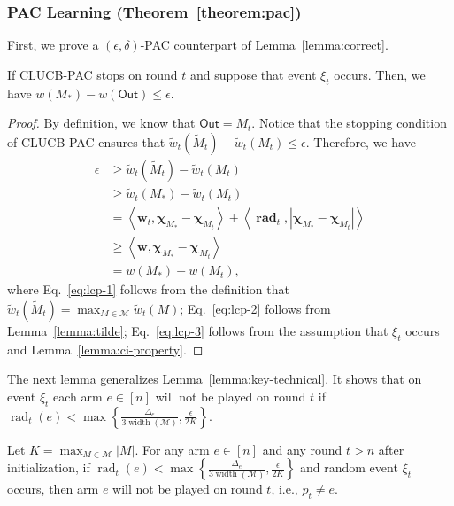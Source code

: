 \documentclass{article}
\newcommand{\AlgorithmPAC}{{\small \textsf{CLUCB-PAC}}\xspace}
\newcommand{\M}{\mathcal M}
\DeclareMathOperator{\rank}{width}
\DeclareMathOperator{\rad}{rad}
\newcommand{\out}{\mathsf{Out}}
\newcommand{\inn}[1]{\left\langle #1 \right\rangle}
\renewcommand{\vec}[1]{\boldsymbol{#1}}
\begin{document}
\subsubsection{PAC Learning (Theorem~\ref{theorem:pac})}
First, we prove a $(\epsilon,\delta)$-PAC counterpart of Lemma~\ref{lemma:correct}.
\begin{lemma}
\label{lemma:pac-correct}
If \AlgorithmPAC stops on round $t$ and suppose that event $\xi_t$ occurs. 
Then, we have $w(M_*)-w(\out) \le \epsilon$.
\end{lemma}

\begin{proof}
By definition, we know that $\out = M_t$.
Notice that the stopping condition of \AlgorithmPAC ensures that $\tilde w_t(\tilde M_t) - \tilde w_t(M_t) \le \epsilon$.
Therefore, we have
\begin{align}
	\epsilon &\ge \tilde w_t(\tilde M_t) - \tilde w_t(M_t) \nonumber \\
           &\ge \tilde w_t(M_*) - \tilde w_t(M_t) \label{eq:lcp-1} \\
           &= \inn{\vec {\bar w}_t, \vec \chi_{M_*}-\vec\chi_{M_t}}+\inn{\vec \rad_t, |\vec \chi_{M_*}-\vec\chi_{M_t}|} \label{eq:lcp-2}\\
           &\ge \inn{\vec w, \vec \chi_{M_*}-\vec\chi_{M_t}}  \label{eq:lcp-3} \\
           &= w(M_*)-w(M_t),\nonumber
\end{align}
where Eq.~\eqref{eq:lcp-1} follows from the definition that $\tilde w_t(\tilde M_t) = \max_{M\in \M}\tilde w_t(M)$;
Eq.~\eqref{eq:lcp-2} follows from Lemma~\ref{lemma:tilde};
Eq.~\eqref{eq:lcp-3} follows from the assumption that $\xi_t$ occurs and Lemma~\ref{lemma:ci-property}.
\end{proof}

The next lemma generalizes Lemma~\ref{lemma:key-technical}.  
It shows that on event $\xi_t$ each arm $e\in [n]$ will not be played on round $t$ if $\rad_t(e) < \max\left\{\frac{\Delta_e}{3\rank(\M)}, \frac{\epsilon}{2K}\right\}$.
\begin{lemma}
\label{lemma:pac-key}
Let $K = \max_{M\in \M} |M|$.
For any arm $e \in [n]$ and any round $t > n$ after initialization, if $\rad_t(e) < \max\left\{\frac{\Delta_e}{3\rank(\M)}, \frac{\epsilon}{2K}\right\}$ and random event $\xi_t$ occurs,
then arm $e$ will not be played on round $t$, i.e., $p_t\not= e$.
\end{lemma}
\end{document}
